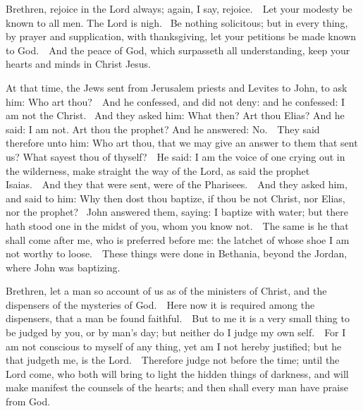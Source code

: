 \bigskip




Brethren, rejoice in the Lord always; again, I say, rejoice.  Let your modesty be known
to all men. The Lord is nigh.   Be nothing solicitous; but in every thing, by
prayer and supplication, with thanksgiving, let your petitions be made known to
God.  And the peace of God, which surpasseth all understanding, keep your
hearts and minds in Christ Jesus.

\medskip


At that time, %
the Jews sent from Jerusalem priests
and Levites to John, to ask him: Who art thou?  And he confessed, and did not
deny: and he confessed: I am not the Christ.   And they asked him: What then?
Art thou Elias? And he said: I am not. Art thou the prophet? And he answered:
No.  They said therefore unto him: Who art thou, that we may give an answer to
them that sent us? What sayest thou of thyself?  He said: I am the voice of one
crying out in the wilderness, make straight the way of the Lord, as said the
prophet Isaias.  And they that were sent, were of the Pharisees.  And they
asked him, and said to him: Why then dost thou baptize, if thou be not Christ,
nor Elias, nor the prophet?   John answered them, saying: I baptize with water;
but there hath stood one in the midst of you, whom you know not.  The same is
he that shall come after me, who is preferred before me: the latchet of whose
shoe I am not worthy to loose.  These things were done in Bethania, beyond the
Jordan, where John was baptizing. 

\bigskip




Brethren, let a man so account of us as of the ministers of Christ, and the dispensers of
the mysteries of God.  Here now it is required among the dispensers, that a man
be found faithful.  But to me it is a very small thing to be judged by you, or
by man's day; but neither do I judge my own self.  For I am not conscious to
myself of any thing, yet am I not hereby justified; but he that judgeth me, is
the Lord.  Therefore judge not before the time; until the Lord come, who both
will bring to light the hidden things of darkness, and will make manifest the
counsels of the hearts; and then shall every man have praise from God.

